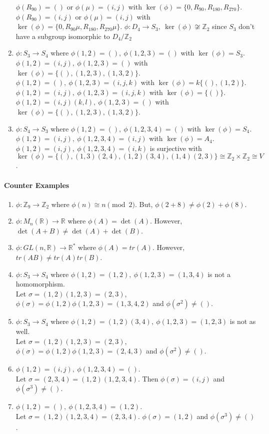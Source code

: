 \begin{enumerate}
		\subitem $\phi(R_{90}) =()$ or $\phi(\mu) =(i,j)$ with $\ker(\phi) = \{ 0,R_{90},R_{180},R_{270} \}$.
		\subitem $\phi(R_{90}) =(i,j)$ or $\phi(\mu) =(i,j)$ with $\ker(\phi) = \{ 0,R_{90}\mu,R_{180},R_{270}\mu \}$.
		\subitem $\phi : D_4 \to S_3,\ \ker(\phi) \not\cong \mathbb{Z}_2$ since $S_3$ don't have a subgroup isomorphic to $D_4/\mathbb{Z}_2$
	\item $\phi : S_3 \to S_4$ where
		\subitem $\phi(1,2)=(),\ \phi(1,2,3)= () $ with $\ker(\phi) = S_3$.
		\subitem $\phi(1,2)=(i,j),\ \phi(1,2,3)= () $ with $\ker(\phi) = \{ (),(1,2,3),(1,3,2) \}$.
		\subitem $\phi(1,2)=(),\ \phi(1,2,3)= (i,j,k) $ with $\ker(\phi) =k \{ (),(1,2) \} $.
		\subitem $\phi(1,2)=(i,j),\ \phi(1,2,3)= (i,j,k) $ with $\ker(\phi) = \{ () \} $.
		\subitem $\phi(1,2)=(i,j)(k,l),\ \phi(1,2,3)= () $ with $\ker(\phi) = \{(),(1,2,3),(1,3,2)\} $.
	\item $\phi : S_4 \to S_3$ where
		\subitem $\phi(1,2)=(),\ \phi(1,2,3,4)= () $ with $\ker(\phi) = S_4$.
		\subitem $\phi(1,2)=(i,j),\ \phi(1,2,3,4)= (i,j) $ with $\ker(\phi) = A_4$.
		\subitem $\phi(1,2)=(i,j),\ \phi(1,2,3,4)= (i,k) $ is surjective with \\$\ker(\phi) = \{ (), (1,3)(2,4), (1,2)(3,4), (1,4)(2,3) \} \cong \mathbb{Z}_2 \times \mathbb{Z}_2 \cong V$.
\end{enumerate}

\paragraph{Counter Examples}
\begin{enumerate}
	\item $\phi : \mathbb{Z}_9 \to \mathbb{Z}_2$ where $\phi(n) \cong n \pmod{2}$. But, $\phi(2+8) \ne \phi(2)+\phi(8)$.
	\item $\phi : M_n(\mathbb{R}) \to \mathbb{R}$ where $\phi(A) = \det(A)$. However, $\det(A+B) \ne \det(A) + \det(B)$.
	\item $\phi : GL(n,\mathbb{R}) \to \mathbb{R}^\ast$ where $\phi(A) = tr(A)$. However, $tr(AB) \ne tr(A) tr(B)$.
	\item $\phi : S_3 \to S_4$ where $\phi(1,2)=(1,2),\ \phi(1,2,3)= (1,3,4)$ is not a homomorphism.\\ Let $\sigma = (1,2)(1,2,3) = (2,3)$, $\phi(\sigma) = \phi(1,2)\phi(1,2,3)=(1,3,4,2)$ and $\phi(\sigma^2) \ne ()$.
	\item $\phi : S_3 \to S_4$ where $\phi(1,2)=(1,2)(3,4),\ \phi(1,2,3)= (1,2,3)$ is not as well.\\ Let $\sigma = (1,2)(1,2,3) = (2,3)$, $\phi(\sigma) = \phi(1,2)\phi(1,2,3)=(2,4,3)$ and $\phi(\sigma^2) \ne ()$.
	\item $\phi(1,2)=(i,j),\ \phi(1,2,3,4)= () $.\\
	Let $\sigma = (2,3,4) = (1,2)(1,2,3,4)$. Then $\phi(\sigma)=(i,j)$ and $\phi(\sigma^3) \ne ()$.
	\item $\phi(1,2)=(),\ \phi(1,2,3,4)= (1,2)$.\\
	Let $\sigma = (1,2)(1,2,3,4) = (2,3,4)$. $\phi(\sigma) = (1,2)$ and $\phi(\sigma^3) \ne ()$.
\end{enumerate}

